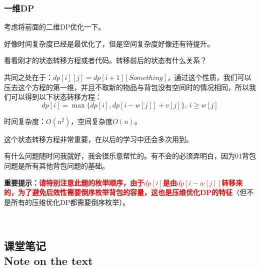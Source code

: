 \documentclass{article}
\theoremstyle{nonumberplain}
\newcommand{\note}{\ \par


	\subsection*{课堂笔记\\\tiny{Note on the text}}
	\newpage}
\begin{document}
\subsubsection{一维DP}
考虑将前面的二维DP优化一下。

好像时间复杂度已经是最优化了，但是空间复杂度好像还有待提升。

看看刚才的状态转移方程或者代码。转移前后的状态有什么关系？

共同之处在于：$dp[i][j]=dp[i+1][Something]$，通过这个性质，我们可以压去这个方程的第一维，并且不取新的物品与背包没有空间时的情况相同，所以我们可以得到以下状态转移方程：
\begin{equation*}dp[i]=\max\{dp[i],dp[i-w[j]]+v[j]\},\ i\geq w[j]\end{equation*}

时间复杂度：$O(n^2)$，空间复杂度$O(n)$。

这个状态转移方程非常重要，在以后的学习中还会多次用到。

有什么问题随时问我就好，我会很乐意帮忙的。有不会的必须弄明白，因为01背包问题是所有其他背包问题的基础。

\textbf{重要提示：}\textcolor{red}{\textbf{请特别注意此题的枚举顺序，由于$dp[i]$是由$dp[i-w[j]]$转移来的，为了避免后效性需要倒序枚举背包的容量，这也是压维优化DP的特征}}（但不是所有的压维优化DP都需要倒序枚举）。

\note
\end{document}
